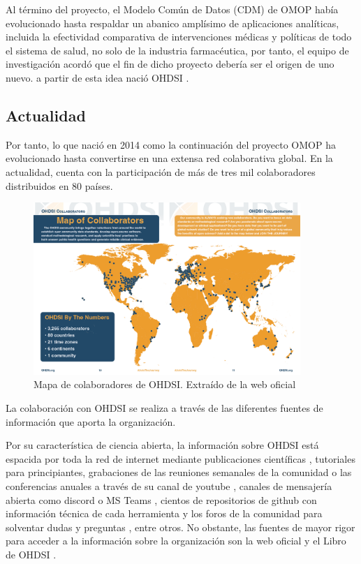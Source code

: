 Al término del proyecto, el Modelo Común de Datos (CDM) de OMOP había evolucionado hasta respaldar un abanico  amplísimo de aplicaciones analíticas, incluida la efectividad comparativa de intervenciones médicas y políticas de todo el sistema de salud, no solo de la industria farmacéutica, por tanto, el equipo de investigación acordó que el fin de dicho proyecto debería ser el origen de uno nuevo. a partir de esta idea nació OHDSI \cite{OHDSIbook}.

\subsection{Actualidad}

Por tanto, lo que nació en 2014 como la continuación del proyecto OMOP ha evolucionado hasta convertirse en una extensa red colaborativa global.  En la actualidad, cuenta con la participación de más de tres mil colaboradores distribuidos en 80 países.

\begin{figure}[H]
    \centering
    \includegraphics[width=0.90\textwidth]{figures/OHDSIcollaborators.png}
     \caption{Mapa de colaboradores de OHDSI. Extraído de la web oficial \cite{OHDSIwebsite}}
    \label{fig:OHDSIcollaborators}
\end{figure}

La colaboración con OHDSI se realiza a través de las diferentes fuentes de información que aporta la organización. 

Por su característica de ciencia abierta, la información sobre OHDSI está espacida por toda la red de internet mediante publicaciones científicas \cite{OHDSIpublications}, tutoriales para principiantes, grabaciones de las reuniones semanales de la comunidad o las conferencias anuales a través de su canal de youtube \cite{OHDSIyt}, canales de mensajería abierta como discord \cite{OHDSIdiscordInvitation} o MS Teams \cite{OHDSIofficeForm}, cientos de repositorios de github con información técnica de cada herramienta \cite{OHDSIgithub} y los foros de la comunidad para solventar dudas y preguntas \cite{OHDSIforums}, entre otros. No obstante, las fuentes de mayor rigor para acceder a la información sobre la organización son la web oficial \cite{OHDSIwebsite} y el Libro de OHDSI \cite{OHDSIbook}.

